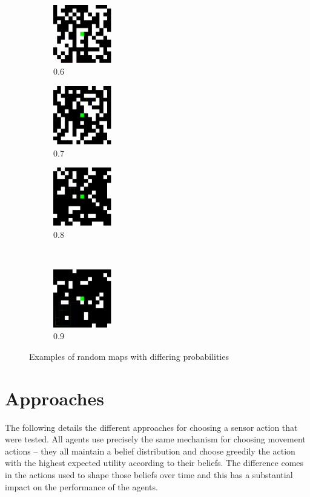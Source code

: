 \documentclass{article}
\begin{document}
\begin{figure}
	\begin{subfigure}[b]{0.2\linewidth}
		\includegraphics[width=1in]{./figures/randommap06}
		\caption{0.6}
	\end{subfigure}
	\begin{subfigure}[b]{0.2\linewidth}
		\includegraphics[width=1in]{./figures/randommap07}
		\caption{0.7}
	\end{subfigure}
	\begin{subfigure}[b]{0.2\linewidth}
		\includegraphics[width=1in]{./figures/randommap08}
		\caption{0.8}
	\end{subfigure}\\
	\begin{subfigure}[b]{0.2\linewidth}
		\includegraphics[width=1in]{./figures/randommap09}
		\caption{0.9}
	\end{subfigure}
	\caption{Examples of random maps with differing probabilities}
	\label{fig:randommaps}
\end{figure}



\section{Approaches}
The following details the different approaches for choosing a sensor action that were 
tested. All agents use precisely the same mechanism for choosing movement actions -- they
all maintain a belief distribution and choose greedily the action with the highest 
expected utility according to their beliefs. The difference comes in the actions used to 
shape those beliefs over time and this has a substantial impact on the performance of 
the agents.
\end{document}
